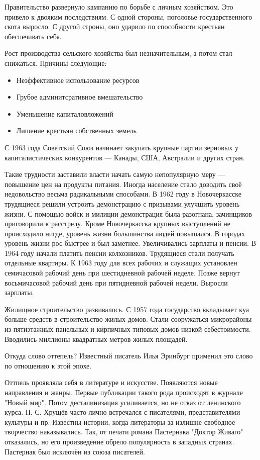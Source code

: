 \documentclass{article}
\begin{document}
Правительство развернуло кампанию по борьбе с личным хозяйством. Это привело к двояким последствиям. С одной стороны, поголовье государственного скота выросло. С другой строны, оно ударило по способности крестьян обеспечивать себя.

Рост производства сельского хозяйства был незначительным, а потом стал снижаться. Причины следующие:
\begin{itemize}
    \item Неэффективное использование ресурсов
    \item Грубое админитсративное вмешательство
    \item Уменьшение капиталовложений
    \item Лишение крестьян собственных земель
\end{itemize}

С 1963 года Советский Союз начинает закупать крупные партии зерновых у капиталистических конкурентов --- Канады, США, Австралии и других стран.

Такие трудности заставили власти начать самую непопулярную меру --- повышение цен на продукты питания. Иногда население стало доводить своё недовольство весьма радикальными способами. В 1962 году в Новочеркасске трудящиеся решили устроить демонстрацию с призывами улучшить уровень жизни. С помощью войск и милиции демонстрация была разогнана, зачинщиков приговорили к расстрелу. Кроме Новочеркасска крупных выступлений не происходило нигде, уровень жизни большинства людей повышался. В городах уровень жизни рос быстрее и был заметнее. Увеличивались зарплаты и пенсии. В 1964 году начали платить пенсии колхозников. Трудящиеся стали получать отдельные квартиры. К 1963 году для всех рабочих и служащих установлен семичасовой рабочий день при шестидневной рабочей неделе. Позже вернут восьмичасовой рабочий день при пятидневной рабочей недели. Выросли зарплаты.

Жилищное строительство развивалось. С 1957 года государство вкладывает куа больше средств в строительство жилых домов. Стали сооружаться микрорайоны из пятиэтажных панельных и кирпичных типовых домов низкой себестоимости. Вводились миллионы квадратных метров жилых площадей.

Откуда слово оттепель? Известный писатель Илья Эринбург применил это слово по отношению к этой эпохе.

Оттпель проявляла себя в литературе и искусстве. Появляются новые направления и жанры. Первые публикации такого рода происходят в журнале "Новый мир". Потом десталинизация усиливается, но не отказ от ленинского курса. Н. С. Хрущёв часто лично встречался с писателями, представителями культуры и пр. Известны истории, когда литераторы за излишне свободное творчество наказывались. Так, от печати романа Пастернака "Доктор Живаго" отказались, но его произведение обрело популярность в западных странах. Пастернак был исключён из союза писателей.
\end{document}
